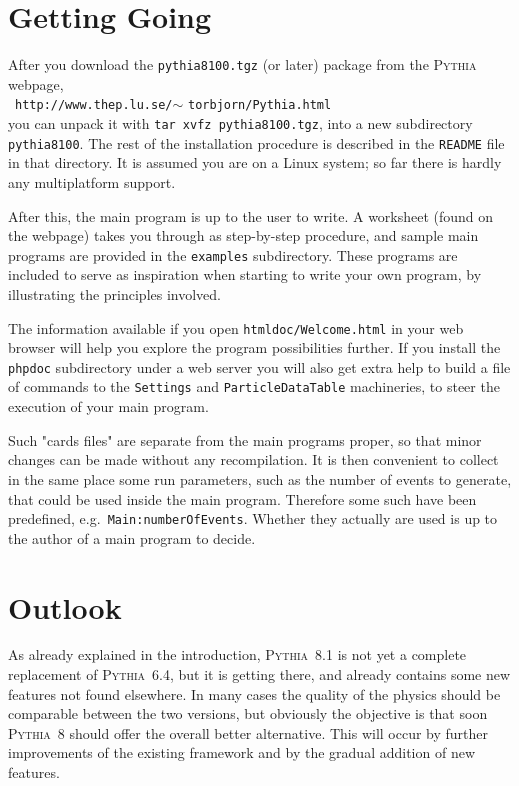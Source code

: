 \documentclass{elsartmod}
\newcommand{\cindent}{\hspace*{10mm}~}
\begin{document}
\section{Getting Going \label{sec:how-to}}

After you download the \texttt{pythia8100.tgz} (or later) package 
from the \textsc{Pythia} webpage,\\ 
\cindent \texttt{http://www.thep.lu.se/}$\sim$%
\texttt{torbjorn/Pythia.html}\\
you can unpack it with \texttt{tar xvfz pythia8100.tgz}, into a new 
subdirectory \texttt{pythia8100}. The rest of the installation procedure 
is described in the \texttt{README} file in that directory. 
It is assumed you are on a Linux system; so far there is hardly any 
multiplatform support.

After this, the main program is up to the user to write. A worksheet
(found on the webpage) takes you through as step-by-step procedure, 
and sample main programs are provided in the \texttt{examples} 
subdirectory. These programs are included to serve as inspiration when 
starting to write your own program, by illustrating the principles 
involved. 

The information available if you open 
\texttt{htmldoc/Welcome.html} in your web browser will help you
explore the program possibilities further. If you install the
\texttt{phpdoc} subdirectory under a web server you will also get
extra help to build a file of commands to the \texttt{Settings} and 
\texttt{ParticleDataTable} machineries, to steer the execution of
your main program.

Such "cards files" are separate from the main programs proper, so that 
minor changes can be made without any recompilation. It is then 
convenient to collect in the same place some run parameters, such as 
the number of events to generate, that could be used inside the 
main program. Therefore some such have been predefined, e.g.\
\texttt{Main:numberOfEvents}. Whether they actually are used is up to 
the author of a main program to decide.

\section{Outlook \label{sec:outlook}}

As already explained in the introduction, \textsc{Pythia}~8.1 is
not yet a complete replacement of \textsc{Pythia}~6.4, but it is 
getting there, and already contains some new features not found 
elsewhere. In many cases the quality of the physics should be
comparable between the two versions, but obviously the objective
is that soon \textsc{Pythia}~8 should offer the overall better 
alternative. This will occur by further improvements of the 
existing framework and by the gradual addition of new features. 
 
\end{document}
